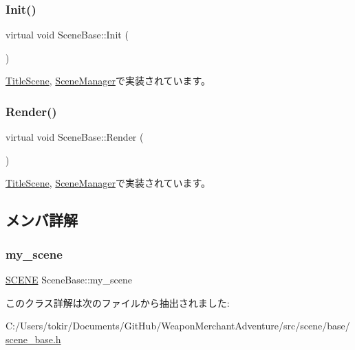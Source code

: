 \subsubsection{\texorpdfstring{Init()}{Init()}}
{\footnotesize\ttfamily virtual void Scene\+Base\+::\+Init (\begin{DoxyParamCaption}{ }\end{DoxyParamCaption})\hspace{0.3cm}{\ttfamily [pure virtual]}}



\mbox{\hyperlink{class_title_scene_a3d039e7db0fa1e22e8c36d3cedfbd318}{Title\+Scene}}, \mbox{\hyperlink{class_scene_manager_a6c0e84d0e76f23fb3172839dba5f091b}{Scene\+Manager}}で実装されています。

\mbox{\label{class_scene_base_ad981674ce731ea267f398e889bbb9dc3}} 
\subsubsection{\texorpdfstring{Render()}{Render()}}
{\footnotesize\ttfamily virtual void Scene\+Base\+::\+Render (\begin{DoxyParamCaption}{ }\end{DoxyParamCaption})\hspace{0.3cm}{\ttfamily [pure virtual]}}



\mbox{\hyperlink{class_title_scene_af12c59b3bf9458640938c5ca620527ae}{Title\+Scene}}, \mbox{\hyperlink{class_scene_manager_a968ae7a0065b793f139bda6bcc58d106}{Scene\+Manager}}で実装されています。



\subsection{メンバ詳解}
\mbox{\label{class_scene_base_a18dcdbacfbd98f73099c3cbeb70ae3b8}} 
\subsubsection{\texorpdfstring{my\+\_\+scene}{my\_scene}}
{\footnotesize\ttfamily \mbox{\hyperlink{scene__base_8h_a24cee5343fb9d0706ead6e8601f363be}{S\+C\+E\+NE}} Scene\+Base\+::my\+\_\+scene\hspace{0.3cm}{\ttfamily [protected]}}



このクラス詳解は次のファイルから抽出されました\+:\begin{DoxyCompactItemize}
\item 
C\+:/\+Users/tokir/\+Documents/\+Git\+Hub/\+Weapon\+Merchant\+Adventure/src/scene/base/\mbox{\hyperlink{scene__base_8h}{scene\+\_\+base.\+h}}\end{DoxyCompactItemize}

